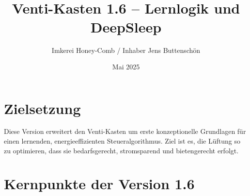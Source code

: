 \documentclass[11pt,a4paper]{article}
\title{Venti-Kasten 1.6 -- Lernlogik und DeepSleep}
\author{Imkerei Honey-Comb / Inhaber Jens Buttensch\"on}
\date{Mai 2025}
\begin{document}
\maketitle

\section*{Zielsetzung}
Diese Version erweitert den Venti-Kasten um erste konzeptionelle Grundlagen für einen lernenden, energieeffizienten Steueralgorithmus. Ziel ist es, die L\"uftung so zu optimieren, dass sie bedarfsgerecht, stromsparend und bietengerecht erfolgt.

\section*{Kernpunkte der Version 1.6}
\end{document}
